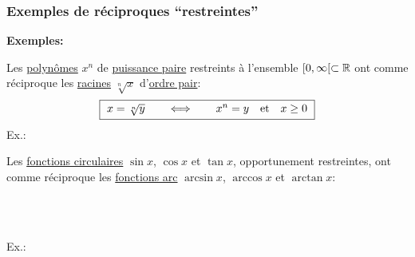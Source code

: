 \begin{frame}
\frametitle{\bf Exemples de r\'eciproques ``restreintes''}
\medskip 

{\small 
{\bf Exemples:}
\begin{itemize}
\bitem
Les \underline{polyn\^omes} $x^n$ de \underline{puissance paire} 
restreints \`a l'ensemble $[0,\infty[ \subset \mathbb R$ ont comme 
r\'eciproque les \underline{racines} $\sqrt[n]{x}$ d'\underline{ordre pair}:
$$
\mbox{\framebox{\ $x=\sqrt[n]{y} \qquad\Longleftrightarrow\qquad 
x^n=y \quad \mbox{et}\quad x\geq 0 $\ }}
$$
Ex.:\quad 
\raisebox{-.5\height}{\grapheXXTOT \quad \grapheXXRED \quad \grapheSQRT}

\pause
\bitem
Les \underline{fonctions circulaires} $\sin x$, $\cos x$ et $\tan x$, 
opportunement restreintes, ont comme r\'eciproque les 
\underline{fonctions arc} $\arcsin x$, $\arccos x$ et $\arctan x$:  
\begin{center}
\\ 
\\  
\framebox{\ $x=\arctan{y} \qquad\Longleftrightarrow\qquad 
\tan x =y \quad \mbox{et}\quad x\in ]-\pi/2,\pi/2[$\ } 
\end{center}
Ex.:\quad 
\raisebox{-.5\height}{\grapheSINTOT \quad \grapheSINRED \quad \grapheASINRED}
\end{itemize}

}

\end{frame}


